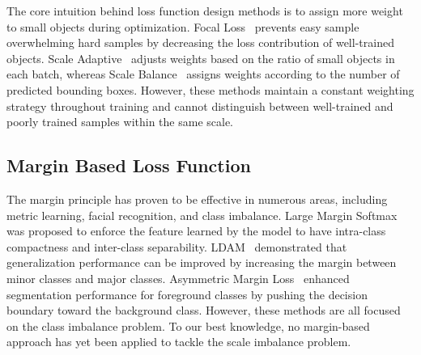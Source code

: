 \documentclass{article}
\begin{document}
The core intuition behind loss function design methods is to assign more weight to small objects during optimization. Focal Loss~\cite{lin2017focal} prevents easy sample overwhelming hard samples by 
decreasing the loss contribution of well-trained objects.
Scale Adaptive~\cite{lv2020small} adjusts weights based on the ratio of small objects in each batch, whereas Scale Balance~\cite{shuang2021scale} assigns weights according to the number of predicted bounding boxes.
However, these methods maintain a constant weighting strategy throughout training and cannot distinguish between well-trained and poorly trained samples within the same scale.

\subsection{Margin Based Loss Function}


The margin principle has proven to be effective in numerous areas, including metric learning, facial recognition, and class imbalance. Large Margin Softmax~\cite{liu2016large} was proposed to enforce the feature learned by the model to have intra-class compactness and inter-class separability. LDAM~\cite{cao2019learning} demonstrated that generalization performance can be improved by increasing the margin between minor classes and major classes. Asymmetric Margin Loss~\cite{li2020analyzing} enhanced segmentation performance for foreground classes by pushing the decision boundary toward the background class. However, these methods are all focused on the class imbalance problem. To our best knowledge, no margin-based approach has yet been applied to tackle the scale imbalance problem.

\end{document}
